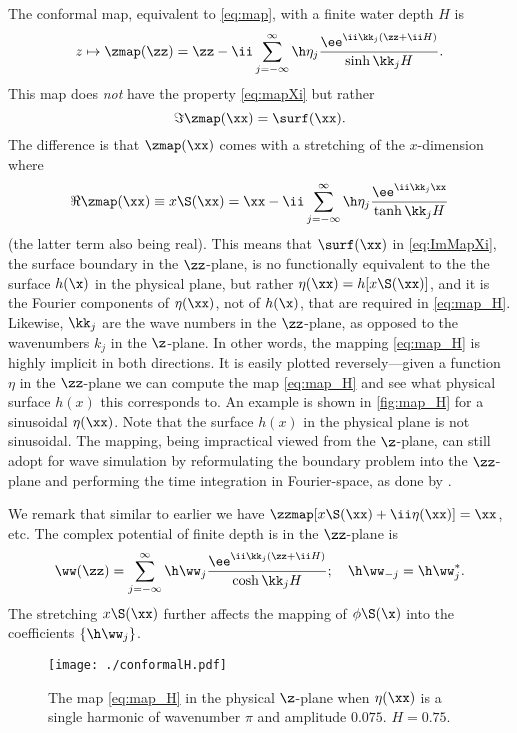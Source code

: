 The conformal map, equivalent to \eqref{eq:map}, with a finite water depth $H$ is
\begin{equation}
z\mapsto \zmap(\zz) = \zz - \ii \sum_{j=-\infty}^\infty \h\eta_j \frac{\ee^{\ii \kk_j(\zz+\ii H)}}{\sinh \kk_jH}.
\label{eq:map_H}
\end{equation}
This map does \textit{not} have the property \eqref{eq:mapXi} but rather
\begin{equation}
\Im \zmap(\xx) = \surf(\xx).
\label{eq:ImMapXi}
\end{equation}
The difference is that $\zmap(\xx)$ comes with a stretching of the $x$-dimension where
\begin{equation}
\Re \zmap(\xx) \equiv x\S(\xx) = \xx -\ii  \sum_{j=-\infty}^\infty \h\eta_j \frac{\ee^{\ii \kk_j\xx}}{\tanh \kk_j H}
\label{eq:mapXi2}
\end{equation}
(the latter term also being real).
This means that $\surf(\xx)$ in \eqref{eq:ImMapXi}, the surface boundary in the $\zz$-plane, is no functionally equivalent to the the surface $h(\x)$ in the physical plane, but rather
$\eta(\xx)=h[x\S(\xx)]$, and it is the Fourier components of $\eta(\xx)$, not of $h(\x)$, that are required in \eqref{eq:map_H}. 
Likewise, $\kk_j$ are the wave numbers in the $\zz$-plane, as opposed to the wavenumbers $k_j$ in the $\z$-plane.
In other words, the mapping \eqref{eq:map_H} is highly implicit in both directions.
It is easily plotted reversely---given a function $\eta$ in the $\zz$-plane we can compute the map \eqref{eq:map_H} and see what physical surface $h(x)$ this corresponds to.
An example is shown in \autoref{fig:map_H} for a sinusoidal $\eta(\xx)$. Note that the surface $h(x)$ in the physical plane is not sinusoidal.
The mapping, being impractical viewed from the $\z$-plane, can still adopt for wave simulation by reformulating the boundary problem into the $\zz$-plane and performing the time integration in Fourier-space, as done by \citet{chalikov2005modeling}.


We remark that similar to earlier we have $\zzmap[x\S(\xx)+\ii\eta(\xx)]=\xx$, etc.
The complex potential of finite depth is in the $\zz$-plane is
\begin{equation}
\ww(\zz) = \sum_{j=-\infty}^\infty\h\ww_j \frac{\ee^{\ii \kk_j(\zz+\ii H)}}{\cosh \kk_j H}; \quad \h\ww_{-j}=\h\ww_{j}^*.
\label{eq:wH}
\end{equation}
The stretching $x\S(\xx)$ further affects the mapping of $\phi\S(\x)$ into the coefficients $\{\h\ww_j\}$.

\begin{figure}[h!ptb]%
\centering
\texttt{[image: ./conformalH.pdf]}%
\caption{The map \eqref{eq:map_H} in the physical $\z$-plane when $\eta(\xx)$ is a single harmonic of wavenumber $\pi$ and amplitude $0.075$. $H=0.75$.}%
\label{fig:map_H}%
\end{figure}

